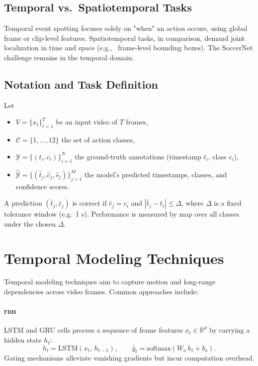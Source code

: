 \subsection{Temporal vs.\ Spatiotemporal Tasks}
Temporal event spotting focuses solely on "when" an action occurs, using global frame or clip-level features. Spatiotemporal tasks, in comparison, demand joint localization in time and space (e.g., \ frame-level bounding boxes). The SoccerNet challenge remains in the temporal domain.

\subsection{Notation and Task Definition}
Let
\begin{itemize}
  \item $V=\{x_t\}_{t=1}^T$ be an input video of $T$ frames,
  \item $\mathcal{C}=\{1,\dots,12\}$ the set of action classes,
  \item $\mathcal{Y}=\{(t_i,c_i)\}_{i=1}^N$ the ground-truth annotations (timestamp $t_i$, class $c_i$),
  \item $\hat{\mathcal{Y}}=\{(\hat t_j,\hat c_j,\hat s_j)\}_{j=1}^M$ the model's predicted timestamps, classes, and confidence scores.
\end{itemize}
A prediction $(\hat t_j,\hat c_j)$ is correct if $\hat c_j=c_i$ and $|\hat t_j - t_i|\le\Delta$, where $\Delta$ is a fixed tolerance window (e.g.\ 1 s). Performance is measured by \acrfull{map} over all classes under the chosen $\Delta$.
\section{Temporal Modeling Techniques}
\label{sec:temporal_models}

Temporal modeling techniques aim to capture motion and long-range dependencies across video frames. Common approaches include: 

\paragraph{\acrfull{rnn}}  
LSTM and GRU cells process a sequence of frame features \(x_t\in\mathbb{R}^d\) by carrying a hidden state \(h_t\):
\[
h_t = \mathrm{LSTM}(x_t,\,h_{t-1}), 
\qquad
\hat y_t = \mathrm{softmax}(W_o\,h_t + b_o).
\]
Gating mechanisms alleviate vanishing gradients but incur computation overhead.

